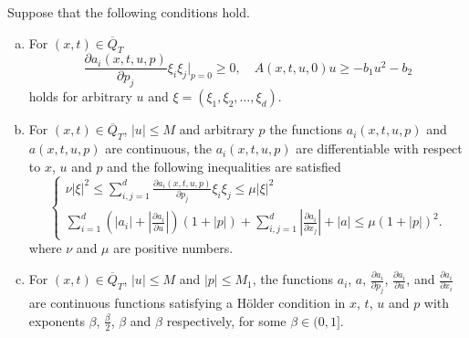 \documentclass[11pt, a4paper]{article}
\begin{document}
\begin{theorem}
\label{thm:classical_existence}
Suppose that the following conditions hold.
\begin{enumerate}[a)]
	\item For $(x,t) \in \overline{Q}_T$ 
	\begin{equation}
		\label{exist_cond1}
		\frac{\partial a_i(x,t,u,p)}{\partial p_j}\xi_i \xi_j \Bigg|_{p=0} \geq 0, \quad A(x,t,u,0)u \geq -b_1 u^2 - b_2
	\end{equation}
	 holds for arbitrary $u$ and $\xi = (\xi_1, \xi_2, \ldots, \xi_d)$.
	
	\item For $(x,t) \in \overline{Q}_T$, $|u| \leq M$ and arbitrary $p$ the functions $a_i(x,t,u,p)$ and $a(x,t,u,p)$ are continuous, the $a_i(x,t,u,p)$ are differentiable with respect to $x$, $u$ and $p$ and the following inequalities are satisfied
	\begin{equation}
	\label{exist_cond3}
		\begin{cases}
			\nu|\xi|^2 \leq \sum_{i,j=1}^d\frac{\partial a_i(x,t,u,p)}{\partial p_j}\xi_i \xi_j \leq \mu |\xi|^2 \\
			\sum_{i=1}^d \left(|a_i| + |\frac{\partial a_i}{\partial u}|\right)(1+|p|) + \sum_{i,j=1}^d |\frac{\partial a_i}{\partial x_j}| + |a| \leq \mu (1 + |p|)^2. 		
		\end{cases}
	\end{equation}
	where $\nu$ and $\mu$ are positive numbers.
	
	\item For $(x,t) \in \overline{Q}_T$, $|u| \leq M$ and $|p| \leq M_1$, the functions $a_i$, $a$, $\frac{\partial a_i}{\partial p_j}$, $\frac{\partial a_i}{\partial u}$, and $\frac{\partial a_i}{\partial x_i}$ are continuous functions satisfying a Hölder condition in $x$, $t$, $u$ and $p$ with exponents $\beta$, $\frac{\beta}{2}$, $\beta$ and $\beta$ respectively, for some $\beta \in (0,1]$.
	

\end{enumerate}
\end{theorem}
\end{document}
